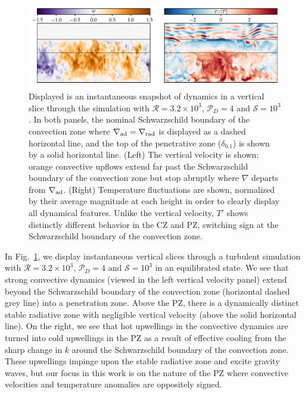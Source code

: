 \documentclass{aastex631}
\newcommand{\gradrad}{\ensuremath{\nabla_{\rm{rad}}}}
\newcommand{\gradad}{\ensuremath{\nabla_{\rm{ad}}}}
\newcommand{\justgrad}{\ensuremath{\nabla}}
\newcommand{\mP}{\ensuremath{\mathcal{P}}}
\newcommand{\mR}{\ensuremath{\mathcal{R}}}
\newcommand{\mS}{\ensuremath{\mathcal{S}}}
\begin{document}
\begin{figure}[t!]
\centering
\includegraphics[width=\textwidth]{vertical_dynamics_panels.pdf}
\caption{
Displayed is an instantaneous snapshot of dynamics in a vertical slice through the simulation with $\mR = 3.2 \times 10^3$, $\mP_D = 4$ and $\mS = 10^3$.
In both panels, the nominal Schwarzschild boundary of the convection zone where $\gradad = \gradrad$ is displayed as a dashed horizontal line, and the top of the penetrative zone ($\delta_{0.1}$) is shown by a solid horizontal line.
(Left) The vertical velocity is shown; orange convective upflows extend far past the Schwarzschild boundary of the convection zone but stop abruptly where $\justgrad$ departs from $\gradad$.
(Right) Temperature fluctuations are shown, normalized by their average magnitude at each height in order to clearly display all dynamical features.
Unlike the vertical velocity, $T'$ shows distinctly different behavior in the CZ and PZ, switching sign at the Schwarzschild boundary of the convection zone.
\label{fig:vertical_dynamics_panels}
}
\end{figure}

In Fig.~\ref{fig:vertical_dynamics_panels}, we display instantaneous vertical slices through a turbulent simulation with $\mR = 3.2 \times 10^3$, $\mP_D = 4$ and $\mS = 10^3$ in an equilibrated state.
We see that strong convective dynamics (viewed in the left vertical velocity panel) extend beyond the Schwarzschild boundary of the convection zone (horizontal dashed grey line) into a penetration zone.
Above the PZ, there is a dynamically distinct stable radiative zone with negligible vertical velocity (above the solid horizontal line).
On the right, we see that hot upwellings in the convective dynamics are turned into cold upwellings in the PZ as a result of effective cooling from the sharp change in $k$ around the Schwarzschild boundary of the convection zone.
These upwellings impinge upon the stable radiative zone and excite gravity waves, but our focus in this work is on the nature of the PZ where convective velocities and temperature anomalies are oppositely signed.
\end{document}
